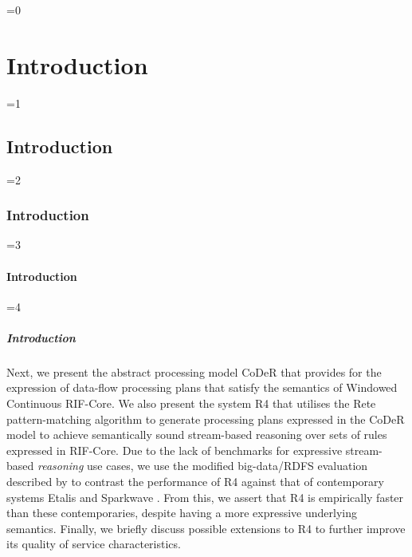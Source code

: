 \documentclass[twocolumn,preprint,3p,number]{elsarticle}
\theoremstyle{plain}
\theoremstyle{definition}
\newcounter{nestingdepth}
\newenvironment{nestedsection}[2]{
  \ifnum\value{nestingdepth}=0
    \chapter{#1}
  \else
    \ifnum\value{nestingdepth}=1
      \section{#1}
    \else
      \ifnum\value{nestingdepth}=2
        \subsection{#1}
      \else
        \ifnum\value{nestingdepth}=3
          \subsubsection{#1}
        \else
          \ifnum\value{nestingdepth}=4
            \paragraph{#1}
          \else
            \PackageError{nestedsections}{Maximum nesting level exceeded!}{uh oh!}
          \fi
        \fi
      \fi
    \fi
  \fi
  \addtocounter{nestingdepth}{1}
  \label{sec:#2}
}{\addtocounter{nestingdepth}{-1}}
\begin{document}
\begin{nestedsection}{Introduction}{intro}
  Next, we present the abstract processing model CoDeR that provides for the expression of data-flow processing plans that satisfy the semantics of Windowed Continuous RIF-Core.
  We also present the system R4 that utilises the Rete pattern-matching algorithm to generate processing plans expressed in the CoDeR model to achieve semantically sound stream-based reasoning over sets of rules expressed in RIF-Core.
  Due to the lack of benchmarks for expressive stream-based \emph{reasoning} use cases, we use the modified big-data/RDFS evaluation described by \citet{sparkwave} to contrast the performance of R4 against that of contemporary systems Etalis \citep{EP-SPARQL} and Sparkwave \citep{sparkwave}.
  From this, we assert that R4 is empirically faster than these contemporaries, despite having a more expressive underlying semantics.
  Finally, we briefly discuss possible extensions to R4 to further improve its quality of service characteristics.
\end{nestedsection}
\end{document}
